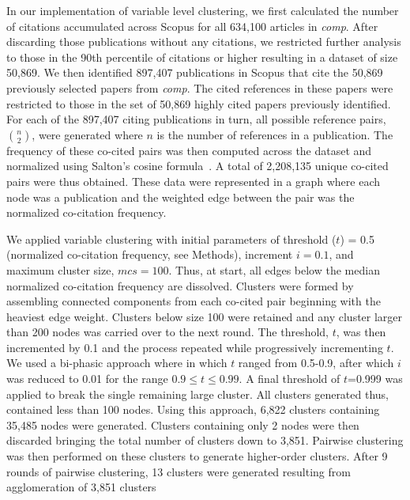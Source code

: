 In our implementation of variable level clustering, we first calculated the number of citations accumulated across Scopus for all 634,100 articles in \emph{comp}. After discarding those publications without any citations, we restricted further analysis to those in the 90th percentile of citations or higher resulting in a dataset of size 50,869. We then identified 897,407 publications in Scopus that cite the 50,869 previously selected papers from \emph{comp}. The cited references in these papers were restricted to those in the set of 50,869 highly cited papers previously identified. For each of the 897,407 citing publications in turn, all possible reference pairs, ${n \choose 2}$, were generated where $n$ is the number of references in a publication. The frequency of these co-cited pairs was then computed across the dataset  and normalized using Salton's cosine formula~\cite{salton_citation_1979}. A total of 2,208,135 unique co-cited pairs were thus obtained. These data were represented in a graph where each node was a publication and the weighted edge between the pair was the normalized co-citation frequency. \par



We applied variable clustering with initial parameters of threshold ($t$) = 0.5 (normalized co-citation frequency, see Methods), increment $i = 0.1$, and maximum cluster size, $mcs = 100$. Thus, at start, all edges below the median normalized co-citation frequency are dissolved. Clusters were formed by assembling connected components from each co-cited pair beginning with the heaviest edge weight. Clusters below size 100 were retained and any cluster larger than 200 nodes was carried over to the next round. The threshold, $t$, was then incremented by 0.1 and the process repeated while progressively incrementing $t$.  We used a bi-phasic approach where in which $t$ ranged from 0.5-0.9, after which $i$ was reduced to 0.01 for the range $0.9 \leq t \leq 0.99$. A final threshold of $t$=0.999 was applied to break the single remaining large cluster. All clusters generated thus, contained  less than 100 nodes.  Using this approach, 6,822 clusters containing 35,485 nodes were generated. Clusters containing only 2 nodes were then discarded bringing the total number of clusters down to 3,851. Pairwise clustering was then performed on these clusters to generate higher-order clusters. After 9 rounds of pairwise clustering, 13 clusters were generated resulting from agglomeration of 3,851 clusters 


